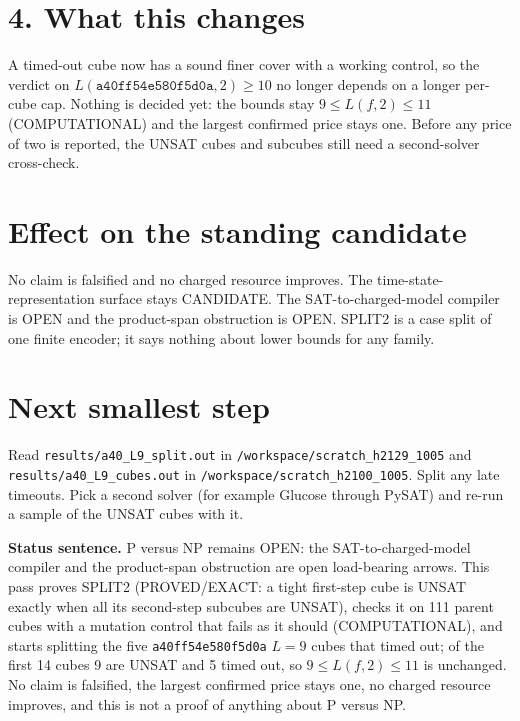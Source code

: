 \documentclass[11pt]{article}
\begin{document}
\section*{4. What this changes}
A timed-out cube now has a sound finer cover with a working control, so the verdict on $L(\texttt{a40ff54e580f5d0a},2)\ge 10$ no longer depends on a longer per-cube cap. Nothing is decided yet: the bounds stay $9\le L(f,2)\le 11$ (COMPUTATIONAL) and the largest confirmed price stays one. Before any price of two is reported, the UNSAT cubes and subcubes still need a second-solver cross-check.

\section*{Effect on the standing candidate}
No claim is falsified and no charged resource improves. The time-state-representation surface stays CANDIDATE. The SAT-to-charged-model compiler is OPEN and the product-span obstruction is OPEN. SPLIT2 is a case split of one finite encoder; it says nothing about lower bounds for any family.

\section*{Next smallest step}
Read \texttt{results/a40\_L9\_split.out} in \texttt{/workspace/scratch\_h2129\_1005} and \texttt{results/a40\_L9\_cubes.out} in \texttt{/workspace/scratch\_h2100\_1005}. Split any late timeouts. Pick a second solver (for example Glucose through PySAT) and re-run a sample of the UNSAT cubes with it.

\bigskip
\noindent\textbf{Status sentence.} P versus NP remains OPEN: the SAT-to-charged-model compiler and the product-span obstruction are open load-bearing arrows. This pass proves SPLIT2 (PROVED/EXACT: a tight first-step cube is UNSAT exactly when all its second-step subcubes are UNSAT), checks it on 111 parent cubes with a mutation control that fails as it should (COMPUTATIONAL), and starts splitting the five \texttt{a40ff54e580f5d0a} $L=9$ cubes that timed out; of the first 14 cubes 9 are UNSAT and 5 timed out, so $9\le L(f,2)\le 11$ is unchanged. No claim is falsified, the largest confirmed price stays one, no charged resource improves, and this is not a proof of anything about P versus NP.
\end{document}
